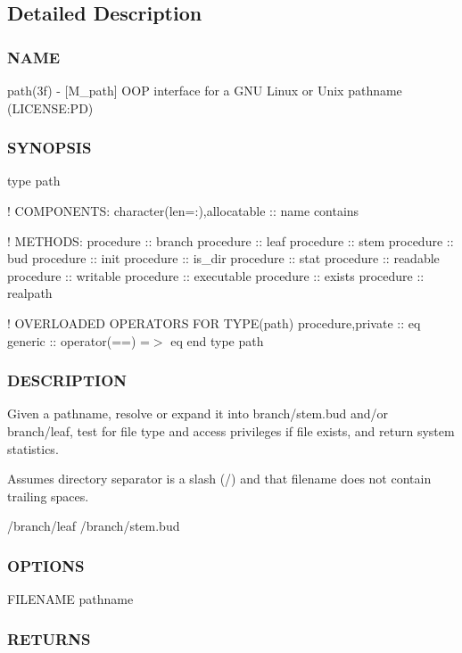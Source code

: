 \subsection{Detailed Description}
\subsubsection*{N\+A\+ME}

path(3f) -\/ \mbox{[}M\+\_\+path\mbox{]} O\+OP interface for a G\+NU Linux or Unix pathname (L\+I\+C\+E\+N\+SE\+:PD) \subsubsection*{S\+Y\+N\+O\+P\+S\+IS}

type path

! C\+O\+M\+P\+O\+N\+E\+N\+TS\+: character(len=\+:),allocatable \+:\+: name contains

! M\+E\+T\+H\+O\+DS\+: procedure \+:\+: branch procedure \+:\+: leaf procedure \+:\+: stem procedure \+:\+: bud procedure \+:\+: init procedure \+:\+: is\+\_\+dir procedure \+:\+: stat procedure \+:\+: readable procedure \+:\+: writable procedure \+:\+: executable procedure \+:\+: exists procedure \+:\+: realpath

! O\+V\+E\+R\+L\+O\+A\+D\+ED O\+P\+E\+R\+A\+T\+O\+RS F\+OR T\+Y\+P\+E(path) procedure,private \+:\+: eq generic \+:\+: operator(==) =$>$ eq end type path

\subsubsection*{D\+E\+S\+C\+R\+I\+P\+T\+I\+ON}

Given a pathname, resolve or expand it into branch/stem.\+bud and/or branch/leaf, test for file type and access privileges if file exists, and return system statistics.

Assumes directory separator is a slash (\textquotesingle{}/\textquotesingle{}) and that filename does not contain trailing spaces.

/branch/leaf /branch/stem.bud

\subsubsection*{O\+P\+T\+I\+O\+NS}

F\+I\+L\+E\+N\+A\+ME pathname

\subsubsection*{R\+E\+T\+U\+R\+NS}


